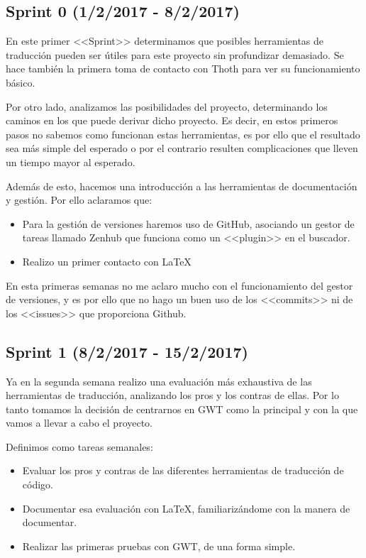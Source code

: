 \subsection{Sprint 0 (1/2/2017 - 8/2/2017)}

En este primer <<Sprint>> determinamos que posibles herramientas de traducción pueden ser útiles para este proyecto sin profundizar demasiado. Se hace también la primera toma de contacto con Thoth para ver su funcionamiento básico.

Por otro lado, analizamos las posibilidades del proyecto, determinando los caminos en los que puede derivar dicho proyecto. Es decir, en estos primeros pasos no sabemos como funcionan estas herramientas, es por ello que el resultado sea más simple del esperado o por el contrario resulten complicaciones que lleven un tiempo mayor al esperado.

Además de esto, hacemos una introducción a las herramientas de documentación y gestión. Por ello aclaramos que:

\begin{itemize}
\item Para la gestión de versiones haremos uso de GitHub, asociando un gestor de tareas llamado Zenhub que funciona como un <<plugin>> en el buscador.
\item Realizo un primer contacto con \LaTeX 
\end{itemize}

En esta primeras semanas no me aclaro mucho con el funcionamiento del gestor de versiones, y es por ello que no hago un buen uso de los <<commits>> ni de los <<issues>> que proporciona Github.

\subsection{Sprint 1 (8/2/2017 - 15/2/2017)}

Ya en la segunda semana realizo una evaluación más exhaustiva de las herramientas de traducción, analizando los pros y los contras de ellas. Por lo tanto tomamos la decisión de centrarnos en GWT como la principal y con la que vamos a llevar a cabo el proyecto.

Definimos como tareas semanales:

\begin{itemize}
\item Evaluar los pros y contras de las diferentes herramientas de traducción de código.
\item Documentar esa evaluación con \LaTeX , familiarizándome con la manera de documentar.
\item Realizar las primeras pruebas con GWT, de una forma simple.
\end{itemize}

